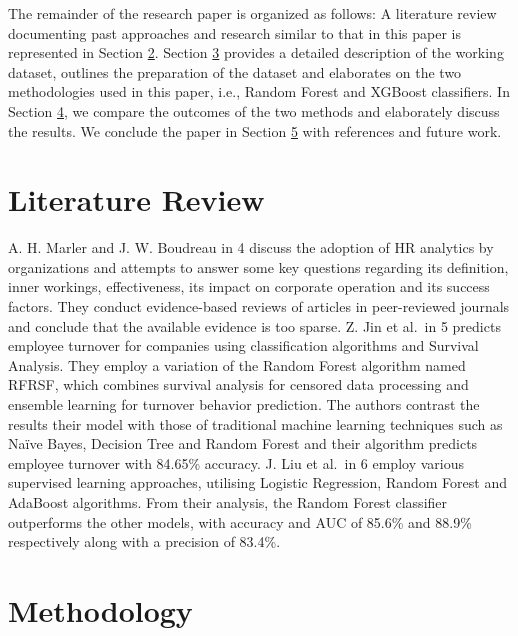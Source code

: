 \documentclass[runningheads]{llncs}
\begin{document}
The remainder of the research paper is organized as follows: A
literature review documenting past approaches and research similar to
that in this paper is represented in Section
\protect\hyperlink{literature-review}{2}. Section
\protect\hyperlink{methodology}{3} provides a detailed description of
the working dataset, outlines the preparation of the dataset and
elaborates on the two methodologies used in this paper, i.e., Random
Forest and XGBoost classifiers. In Section
\protect\hyperlink{results}{4}, we compare the outcomes of the two
methods and elaborately discuss the results. We conclude the paper in
Section \protect\hyperlink{conclusion}{5} with references and future
work.

\hypertarget{literature-review}{%
\section{Literature Review}\label{literature-review}}

A. H. Marler and J. W. Boudreau in
\cite{ref-Marler2017}{4} discuss the adoption of HR
analytics by organizations and attempts to answer some key questions
regarding its definition, inner workings, effectiveness, its impact on
corporate operation and its success factors. They conduct evidence-based
reviews of articles in peer-reviewed journals and conclude that the
available evidence is too sparse. Z. Jin et al.~in
\cite{ref-Jin2020}{5} predicts employee turnover for
companies using classification algorithms and Survival Analysis. They
employ a variation of the Random Forest algorithm named RFRSF, which
combines survival analysis for censored data processing and ensemble
learning for turnover behavior prediction. The authors contrast the
results their model with those of traditional machine learning
techniques such as Naïve Bayes, Decision Tree and Random Forest and
their algorithm predicts employee turnover with 84.65\% accuracy. J. Liu
et al.~in \cite{ref-Liu2019}{6} employ various
supervised learning approaches, utilising Logistic Regression, Random
Forest and AdaBoost algorithms. From their analysis, the Random Forest
classifier outperforms the other models, with accuracy and AUC of 85.6\%
and 88.9\% respectively along with a precision of 83.4\%.

\hypertarget{methodology}{%
\section{Methodology}\label{methodology}}
\end{document}
